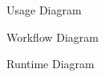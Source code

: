 \begin{frame}{Usage Diagram}
	
\end{frame}
	
\begin{frame}{Workflow Diagram}
	
\end{frame}

\begin{frame}{Runtime Diagram}
	
\end{frame}
